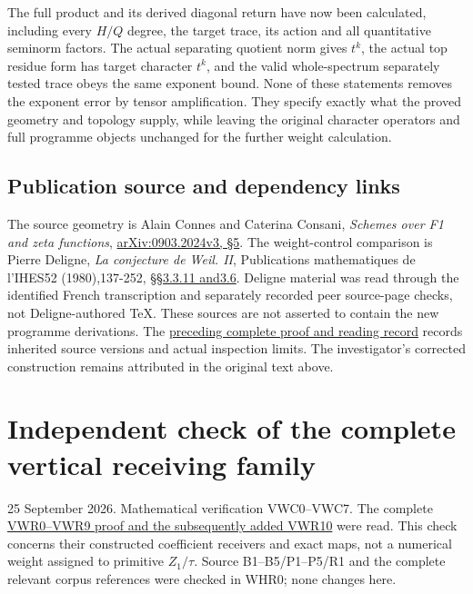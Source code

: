 The full product and its derived diagonal return have now been
calculated, including every \(H/Q\) degree, the target trace, its action
and all quantitative seminorm factors. The actual separating quotient
norm gives \(t^k\), the actual top residue form has target character
\(t^k\), and the valid whole-spectrum separately tested trace obeys the
same exponent bound. None of these statements removes the exponent error
by tensor amplification. They specify exactly what the proved geometry
and topology supply, while leaving the original character operators and
full programme objects unchanged for the further weight calculation.

\section{Publication source and dependency
links}\label{publication-source-and-dependency-links-10}

The source geometry is Alain Connes and Caterina Consani, \emph{Schemes
over F1 and zeta functions},
\href{https://arxiv.org/abs/0903.2024v3}{arXiv:0903.2024v3, §5}. The
weight-control comparison is Pierre Deligne, \emph{La conjecture de
Weil. II}, Publications mathematiques de l'IHES52 (1980),137-252,
\href{https://www.numdam.org/item/PMIHES_1980__52__137_0/}{§§3.3.11
and3.6}. Deligne material was read through the identified French
transcription and separately recorded peer source-page checks, not
Deligne-authored TeX. These sources are not asserted to contain the new
programme derivations. The
\href{https://github.com/KokunoYumeto/zeta-function-research-reader/blob/36a82ecca98addb8a98b48204e349737856c7223/workbenches/splitzero-tandem/continuations/20260924-cohomology-weight-and-character-lifts/BUILD_AND_REVIEW.md}{preceding
complete proof and reading record} records inherited source versions and
actual inspection limits. The investigator's corrected construction
remains attributed in the original text above.

\chapter{Independent check of the complete vertical receiving
family}\label{independent-check-of-the-complete-vertical-receiving-family}

25 September 2026. Mathematical verification VWC0--VWC7. The complete
\href{https://github.com/KokunoYumeto/zeta-function-research-reader/blob/main/workbenches/splitzero-tandem/continuations/20260925-full-source-tensor-and-original-divisor/counterfactual/FULL_VERTICAL_WEIGHT_RETURN.md}{VWR0--VWR9
proof and the subsequently added VWR10} were read. This check concerns
their constructed coefficient receivers and exact maps, not a numerical
weight assigned to primitive \(Z_1/\tau\). Source B1--B5/P1--P5/R1 and
the complete relevant corpus references were checked in WHR0; none
changes here.

